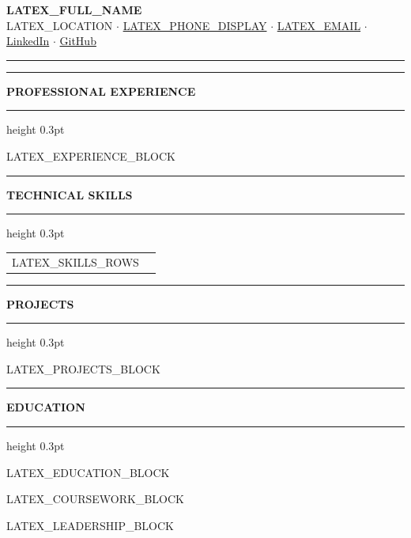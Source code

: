 \documentclass[10pt,letterpaper]{article}
\newcommand{\resumesection}[1]{
    \par\noindent
    \vspace{6pt}
    {\color{accentcolor}\rule{0.3in}{1.5pt}}
    \hspace{4pt}
    {\large\textbf{\color{namecolor}#1}}
    \vspace{3pt}
    \hrule height 0.3pt \color{black}
    \vspace{3pt}
}
\begin{document}
\begin{center}
    {\Huge\textbf{\color{namecolor}LATEX_FULL_NAME}}\\
    \vspace{2pt}
    {\small\color{subcolor}
    LATEX_LOCATION $\cdot$
    \href{tel:LATEX_PHONE_RAW}{LATEX_PHONE_DISPLAY} $\cdot$
    \href{mailto:LATEX_EMAIL}{LATEX_EMAIL} $\cdot$
    \href{LATEX_LINKEDIN_URL}{LinkedIn} $\cdot$
    \href{LATEX_GITHUB_URL}{GitHub}
    }
\end{center}
\vspace{2pt}
{\color{accentcolor}\rule{\textwidth}{1.5pt}}
\vspace{2pt}

\resumesection{PROFESSIONAL EXPERIENCE}
LATEX_EXPERIENCE_BLOCK

\resumesection{TECHNICAL SKILLS}
\begin{tabular}{@{}p{1.7in}p{5.0in}@{}}
LATEX_SKILLS_ROWS
\end{tabular}

\resumesection{PROJECTS}
LATEX_PROJECTS_BLOCK

\resumesection{EDUCATION}
LATEX_EDUCATION_BLOCK

LATEX_COURSEWORK_BLOCK

LATEX_LEADERSHIP_BLOCK
\end{document}
